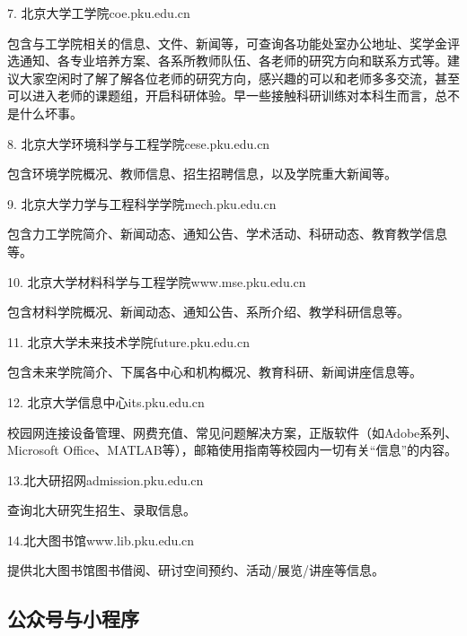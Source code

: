 7. 北京大学工学院\quad coe.pku.edu.cn

包含与工学院相关的信息、文件、新闻等，可查询各功能处室办公地址、奖学金评选通知、各专业培养方案、各系所教师队伍、各老师的研究方向和联系方式等。建议大家空闲时了解了解各位老师的研究方向，感兴趣的可以和老师多多交流，甚至可以进入老师的课题组，开启科研体验。早一些接触科研训练对本科生而言，总不是什么坏事。

\vspace{10pt}

8. 北京大学环境科学与工程学院\quad cese.pku.edu.cn

包含环境学院概况、教师信息、招生招聘信息，以及学院重大新闻等。

\vspace{10pt}

9. 北京大学力学与工程科学学院\quad mech.pku.edu.cn

包含力工学院简介、新闻动态、通知公告、学术活动、科研动态、教育教学信息等。

\vspace{10pt}

10. 北京大学材料科学与工程学院\quad www.mse.pku.edu.cn

包含材料学院概况、新闻动态、通知公告、系所介绍、教学科研信息等。

\vspace{10pt}

11. 北京大学未来技术学院\quad future.pku.edu.cn

包含未来学院简介、下属各中心和机构概况、教育科研、新闻讲座信息等。

\vspace{10pt}

12. 北京大学信息中心\quad its.pku.edu.cn

校园网连接设备管理、网费充值、常见问题解决方案，正版软件（如Adobe系列、Microsoft Office、MATLAB等），邮箱使用指南等校园内一切有关“信息”的内容。

\vspace{10pt}

13.北大研招网\quad admission.pku.edu.cn

查询北大研究生招生、录取信息。

\vspace{10pt}

14.北大图书馆\quad www.lib.pku.edu.cn

提供北大图书馆图书借阅、研讨空间预约、活动/展览/讲座等信息。
	
\newpage

\subsection{公众号与小程序}

